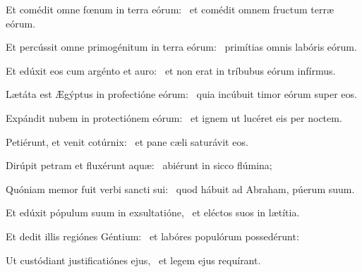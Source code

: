 \item Et comédit omne fœnum in terra eórum:~\psstar{} et comédit omnem fructum terræ eórum.

\item Et percússit omne primogénitum in terra eórum:~\psstar{} primítias omnis labóris eórum.

\item Et edúxit eos cum argénto et auro:~\psstar{} et non erat in tríbubus eórum infírmus.

\item Lætáta est Ægýptus in profectióne eórum:~\psstar{} quia incúbuit timor eórum super eos.

\item Expándit nubem in protectiónem eórum:~\psstar{} et ignem ut lucéret eis per noctem.

\item Petiérunt, et venit cotúrnix:~\psstar{} et pane cæli saturávit eos.

\item Dirúpit petram et fluxérunt aquæ:~\psstar{} abiérunt in sicco flúmina;

\item Quóniam memor fuit verbi sancti sui:~\psstar{} quod hábuit ad Abraham, púerum suum.

\item Et edúxit pópulum suum in exsultatióne,~\psstar{} et eléctos suos in lætítia.

\item Et dedit illis regiónes Géntium:~\psstar{} et labóres populórum possedérunt:

\item Ut custódiant justificatiónes ejus,~\psstar{} et legem ejus requírant.